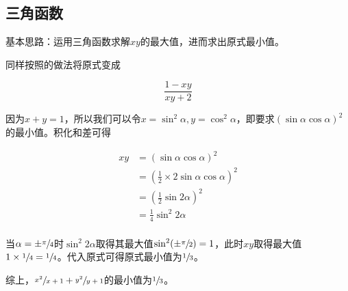 \subsection{三角函数}

基本思路：运用三角函数求解$xy$的最大值，进而求出原式最小值。

同样按照的做法将原式变成

\[ \frac{1 - xy}{xy + 2} \]

因为$x + y = 1$，所以我们可以令$x = \sin^2\alpha, y = \cos^2\alpha$，即要求$(\sin\alpha \cos\alpha)^2$的最小值。积化和差可得

\begin{align*}
  xy &= (\sin\alpha \cos\alpha)^2 \\
  &= (\frac12\times 2\sin\alpha \cos\alpha)^2 \\
  &= (\frac12\sin2\alpha)^2 \\
  &= \frac14\sin^2 2\alpha \\
\end{align*}

当$\alpha = \pm\sfrac\pi 4$时$\sin^2 2\alpha$取得其最大值$\sin^2(\pm\sfrac\pi 2) = 1$，此时$xy$取得最大值$1\times\sfrac14 = \sfrac14$。代入原式可得原式最小值为$\sfrac13$。

综上，$\sfrac{x^2}{x + 1} + \sfrac{y^2}{y + 1}$的最小值为$\sfrac13$。
